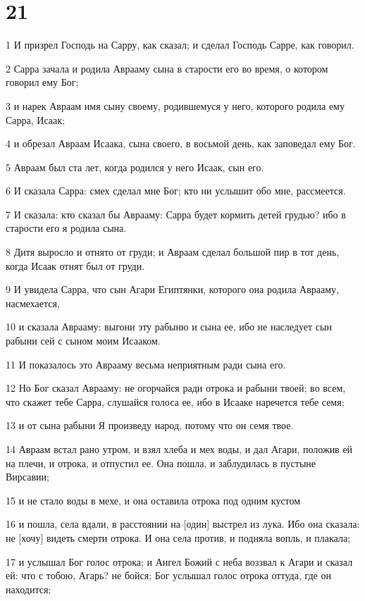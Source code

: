 \chapter{21}

\par 1 И призрел Господь на Сарру, как сказал; и сделал Господь Сарре, как говорил.
\par 2 Сарра зачала и родила Аврааму сына в старости его во время, о котором говорил ему Бог;
\par 3 и нарек Авраам имя сыну своему, родившемуся у него, которого родила ему Сарра, Исаак;
\par 4 и обрезал Авраам Исаака, сына своего, в восьмой день, как заповедал ему Бог.
\par 5 Авраам был ста лет, когда родился у него Исаак, сын его.
\par 6 И сказала Сарра: смех сделал мне Бог; кто ни услышит обо мне, рассмеется.
\par 7 И сказала: кто сказал бы Аврааму: Сарра будет кормить детей грудью? ибо в старости его я родила сына.
\par 8 Дитя выросло и отнято от груди; и Авраам сделал большой пир в тот день, когда Исаак отнят был от груди.
\par 9 И увидела Сарра, что сын Агари Египтянки, которого она родила Аврааму, насмехается,
\par 10 и сказала Аврааму: выгони эту рабыню и сына ее, ибо не наследует сын рабыни сей с сыном моим Исааком.
\par 11 И показалось это Аврааму весьма неприятным ради сына его.
\par 12 Но Бог сказал Аврааму: не огорчайся ради отрока и рабыни твоей; во всем, что скажет тебе Сарра, слушайся голоса ее, ибо в Исааке наречется тебе семя;
\par 13 и от сына рабыни Я произведу народ, потому что он семя твое.
\par 14 Авраам встал рано утром, и взял хлеба и мех воды, и дал Агари, положив ей на плечи, и отрока, и отпустил ее. Она пошла, и заблудилась в пустыне Вирсавии;
\par 15 и не стало воды в мехе, и она оставила отрока под одним кустом
\par 16 и пошла, села вдали, в расстоянии на [один] выстрел из лука. Ибо она сказала: не [хочу] видеть смерти отрока. И она села против, и подняла вопль, и плакала;
\par 17 и услышал Бог голос отрока; и Ангел Божий с неба воззвал к Агари и сказал ей: что с тобою, Агарь? не бойся; Бог услышал голос отрока оттуда, где он находится;
